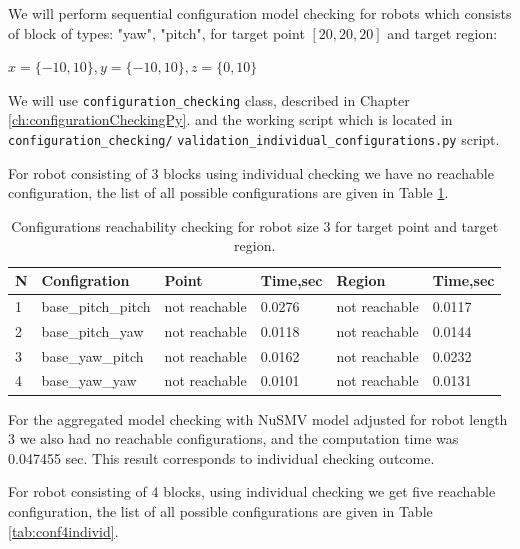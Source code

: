 We will perform sequential configuration model checking for robots which consists of 
block of types: "yaw", "pitch", 
for target point $[20,20,20]$ and target region:

$x=\{-10,10\}, y=\{-10,10\}, z=\{0,10\}$

We will use \texttt{configuration\_checking} class, described in Chapter \ref{ch:configurationCheckingPy}.
and the working script which is located in \texttt{configuration\_checking/}
\texttt{validation\_individual\_configurations.py} script.

For robot consisting of  3 blocks using individual checking 
we  have no reachable configuration, 
the list of all possible configurations are given in Table \ref{tab:conf3individ}.


\begin{table}[h!]
\begin{tabular}{|l|l|l|l|l|l|}
\hline
N  & Configration                           & Point  & Time,sec   & Region  & Time,sec    \\ \hline
1 & base\_pitch\_pitch &  not reachable   & 0.0276    & not reachable  & 0.0117 \\ \hline
2 & base\_pitch\_yaw   &  not reachable   & 0.0118    & not reachable  & 0.0144 \\ \hline
3 & base\_yaw\_pitch   &  not reachable   & 0.0162    & not reachable  & 0.0232 \\ \hline
4 & base\_yaw\_yaw     &  not reachable   & 0.0101    & not reachable  & 0.0131 \\ \hline
\end{tabular}
\caption{Configurations reachability checking for robot size 3 for target point and target region.}
\label{tab:conf3individ}
\end{table}

For the aggregated model checking with NuSMV model adjusted for robot length 3 we  
also had no reachable configurations, and the computation time was 0.047455 sec.
This result corresponds to individual checking outcome.

For robot consisting of 4 blocks, using individual checking 
we get five reachable configuration,
the list of all possible configurations are given in Table \ref{tab:conf4individ}.

